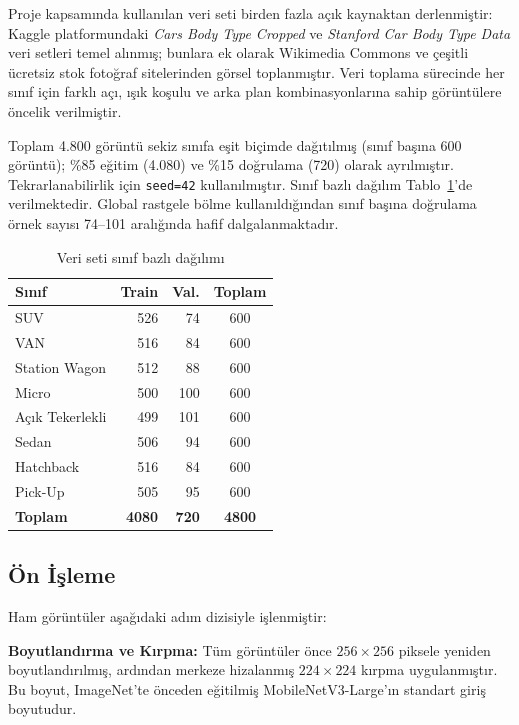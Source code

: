 \documentclass[conference]{IEEEtran}
\begin{document}
Proje kapsamında kullanılan veri seti birden fazla açık kaynaktan
derlenmiştir: Kaggle platformundaki \textit{Cars Body Type Cropped}
ve \textit{Stanford Car Body Type Data} veri setleri temel alınmış;
bunlara ek olarak Wikimedia Commons ve çeşitli ücretsiz stok fotoğraf
sitelerinden görsel toplanmıştır. Veri toplama sürecinde her sınıf için
farklı açı, ışık koşulu ve arka plan kombinasyonlarına sahip görüntülere
öncelik verilmiştir.

Toplam 4.800 görüntü sekiz sınıfa eşit biçimde dağıtılmış (sınıf başına
600 görüntü); \%85 eğitim (4.080) ve \%15 doğrulama (720) olarak
ayrılmıştır. Tekrarlanabilirlik için \texttt{seed=42} kullanılmıştır.
Sınıf bazlı dağılım Tablo~\ref{tab:dataset}'de verilmektedir. Global
rastgele bölme kullanıldığından sınıf başına doğrulama örnek sayısı
74--101 aralığında hafif dalgalanmaktadır.

\begin{table}[h]
\caption{Veri seti sınıf bazlı dağılımı}
\label{tab:dataset}
\centering
\small
\begin{tabular}{lrrc}
\toprule
\textbf{Sınıf}   & \textbf{Train} & \textbf{Val.} & \textbf{Toplam} \\
\midrule
SUV              & 526   & 74   & 600  \\
VAN              & 516   & 84   & 600  \\
Station Wagon    & 512   & 88   & 600  \\
Micro            & 500   & 100  & 600  \\
Açık Tekerlekli  & 499   & 101  & 600  \\
Sedan            & 506   & 94   & 600  \\
Hatchback        & 516   & 84   & 600  \\
Pick-Up          & 505   & 95   & 600  \\
\midrule
\textbf{Toplam}  & \textbf{4080} & \textbf{720} & \textbf{4800} \\
\bottomrule
\end{tabular}
\end{table}

\subsection{Ön İşleme}

Ham görüntüler aşağıdaki adım dizisiyle işlenmiştir:

\textbf{Boyutlandırma ve Kırpma:} Tüm görüntüler önce $256\times256$
piksele yeniden boyutlandırılmış, ardından merkeze hizalanmış
$224\times224$ kırpma uygulanmıştır. Bu boyut, ImageNet'te önceden
eğitilmiş MobileNetV3-Large'ın standart giriş boyutudur.
\end{document}
